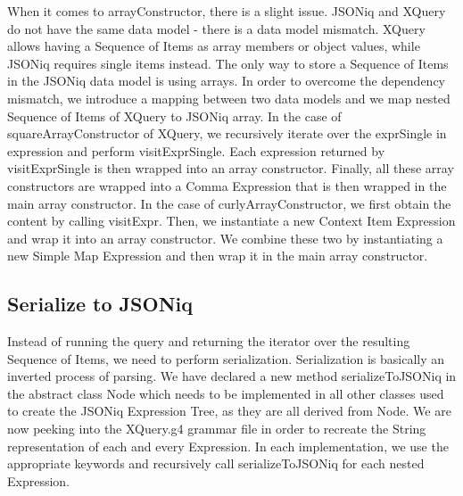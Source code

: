 When it comes to arrayConstructor, there is a slight issue. JSONiq and XQuery do not have the same data model - there is a data model mismatch. XQuery allows having a Sequence of Items as array members or object values, while JSONiq requires single items instead. The only way to store a Sequence of Items in the JSONiq data model is using arrays. In order to overcome the dependency mismatch, we introduce a mapping between two data models and we map nested Sequence of Items of XQuery to JSONiq array. In the case of squareArrayConstructor of XQuery, we recursively iterate over the exprSingle in expression and perform visitExprSingle. Each expression returned by visitExprSingle is then wrapped into an array constructor. Finally, all these array constructors are wrapped into a Comma Expression that is then wrapped in the main array constructor. In the case of curlyArrayConstructor, we first obtain the content by calling visitExpr. Then, we instantiate a new Context Item Expression and wrap it into an array constructor. We combine these two by instantiating a new Simple Map Expression and then wrap it in the main array constructor.

\subsection{Serialize to JSONiq}
Instead of running the query and returning the iterator over the resulting Sequence of Items, we need to perform serialization. Serialization is basically an inverted process of parsing. We have declared a new method serializeToJSONiq in the abstract class Node which needs to be implemented in all other classes used to create the JSONiq Expression Tree, as they are all derived from Node. We are now peeking into the XQuery.g4 grammar file in order to recreate the String representation of each and every Expression. In each implementation, we use the appropriate keywords and recursively call serializeToJSONiq for each nested Expression. 

